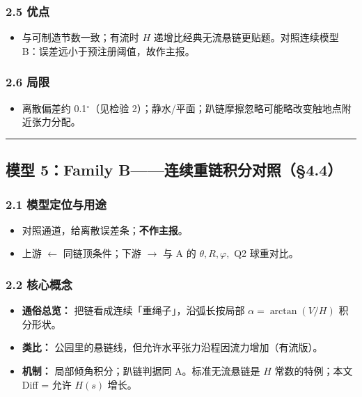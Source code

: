 \documentclass[UTF8,a4paper,zihao=-4]{ctexart}
\begin{document}
\subsubsection{\texorpdfstring{2.5 优点}{2.5 优点}}
\begin{itemize}[leftmargin=1.5em]
\item 与可制造节数一致；有流时 \(H\) 递增比经典无流悬链更贴题。对照连续模型 B：误差远小于预注册阈值，故作主报。
\end{itemize}

\subsubsection{\texorpdfstring{2.6 局限}{2.6 局限}}
\begin{itemize}[leftmargin=1.5em]
\item 离散偏差约 0.1$^\circ$（见检验 2）；静水/平面；趴链摩擦忽略可能略改变触地点附近张力分配。
\end{itemize}

\vspace{0.4em}\hrule\vspace{0.4em}

\subsection{\texorpdfstring{模型 5：Family B------连续重链积分对照（§4.4）}{模型 5：Family B------连续重链积分对照（§4.4）}}

\subsubsection{\texorpdfstring{2.1 模型定位与用途}{2.1 模型定位与用途}}
\begin{itemize}[leftmargin=1.5em]
\item 对照通道，给离散误差条；\textbf{不作主报}。
\item 上游 $\leftarrow$ 同链顶条件；下游 $\rightarrow$ 与 A 的 \(\theta,R,\varphi,\) Q2 球重对比。
\end{itemize}

\subsubsection{\texorpdfstring{2.2 核心概念}{2.2 核心概念}}
\begin{itemize}[leftmargin=1.5em]
\item \textbf{通俗总览：} 把链看成连续「重绳子」，沿弧长按局部 \(\alpha=\arctan(V/H)\) 积分形状。
\item \textbf{类比：} 公园里的悬链线，但允许水平张力沿程因流力增加（有流版）。
\item \textbf{机制：} 局部倾角积分；趴链判据同 A。标准无流悬链是 \(H\) 常数的特例；本文 Diff = 允许 \(H(s)\) 增长。
\end{itemize}
\end{document}
